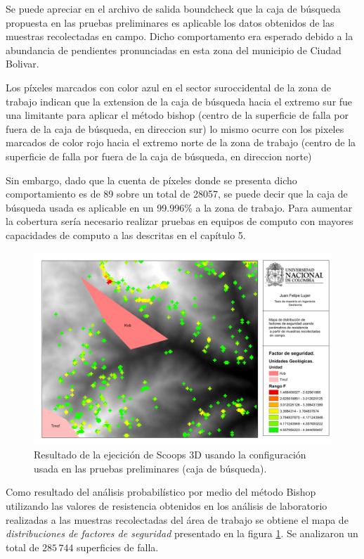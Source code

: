 Se puede apreciar en el archivo de salida \textsf{boundcheck} que la caja de b\'usqueda propuesta en las pruebas preliminares es aplicable los datos obtenidos de las muestras recolectadas en campo. Dicho comportamento era esperado debido a la abundancia de pendientes pronunciadas en esta zona del municipio de Ciudad Bolivar.

Los p\'ixeles marcados con color azul en el sector suroccidental de la zona de trabajo indican que la extension de la caja de b\'usqueda hacia el extremo sur fue una limitante para aplicar el m\'etodo bishop (centro de la superficie de falla por fuera de la caja de b\'usqueda, en direccion sur) lo mismo ocurre con los pixeles marcados de color rojo hacia el extremo norte de la zona de trabajo (centro de la superficie de falla por fuera de la caja de b\'usqueda, en direccion norte)

Sin embargo, dado que la cuenta de p\'ixeles donde se presenta dicho comportamiento es de 89 sobre un total de 28057, se puede decir que la caja de b\'usqueda usada es aplicable en un 99.996\% a la zona de trabajo.
Para aumentar la cobertura ser\'ia necesario realizar pruebas en equipos de computo con mayores capacidades de computo a las descritas en el cap\'itulo 5.


\begin{figure}[H]
\centering
\includegraphics[scale=0.3]{img/fos3DCampo_coarse.pdf}
\caption{Resultado  de la ejecici\'on de Scoops 3D usando la configuraci\'on usada en las pruebas preliminares (caja de b\'usqueda).}
\label{fig:fos3dout_coarse}
\end{figure}


Como resultado del an\'alisis probabil\'istico por medio del m\'etodo Bishop utilizando las valores de resistencia obtenidos en los an\'alisis de laboratorio realizadas a las muestras recolectadas del \'area de trabajo se obtiene el mapa de \emph{distribuciones de factores de seguridad} presentado en la figura \ref{fig:fos3dout_coarse}.
Se analizaron un total de \(285\,744\) superficies de falla.

